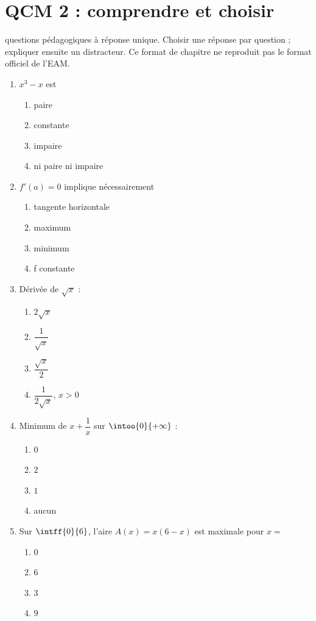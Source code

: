 \endgroup
\begingroup\small
{}\section*{QCM 2 : comprendre et choisir}\label{C06-Q2}
 questions pédagogiques à réponse unique. Choisir une réponse par question ; expliquer ensuite un distracteur. Ce format de chapitre ne reproduit pas le format officiel de l’EAM.
\begin{enumerate}
\item $x^3-x$ est
\begin{enumerate}[label=\Alph*.,itemsep=2pt]
\item paire
\item constante
\item impaire
\item ni paire ni impaire
\end{enumerate}
\item $f\prime(a)=0$ implique nécessairement
\begin{enumerate}[label=\Alph*.,itemsep=2pt]
\item tangente horizontale
\item maximum
\item minimum
\item f constante
\end{enumerate}
\item Dérivée de $\sqrt x$ :
\begin{enumerate}[label=\Alph*.,itemsep=2pt]
\item $2\sqrt x$
\item $\dfrac{1}{\sqrt x}$
\item $\dfrac{\sqrt x}{2}$
\item $\dfrac{1}{2\sqrt x}$, $x>0$
\end{enumerate}
\item Minimum de $x+\dfrac{1}{x}$ sur $\intoo{0}{+\infty}$ :
\begin{enumerate}[label=\Alph*.,itemsep=2pt]
\item $0$
\item $2$
\item $1$
\item aucun
\end{enumerate}
\item Sur $\intff{0}{6}$, l’aire $A(x)=x(6-x)$ est maximale pour $x=$
\begin{enumerate}[label=\Alph*.,itemsep=2pt]
\item $0$
\item $6$
\item $3$
\item $9$
\end{enumerate}
\end{enumerate}
